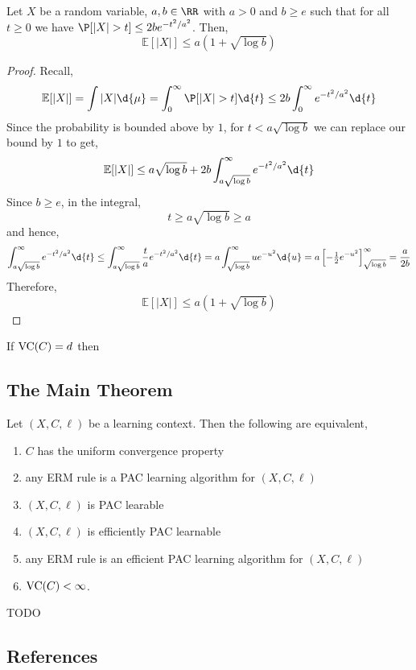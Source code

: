 \documentclass[12pt]{article}
\renewcommand{\E}{\mathbb{E}}
\begin{document}
\label{lemma_A}

\begin{lemma}
Let $X$ be a random variable, $a, b \in \RR$ with $a > 0$ and $b \ge e$ such that for all $t \ge 0$ we have $\P[|X| > t] \le 2 b e^{-t^2 / a^2}$. Then,
\[ \E[|X|] \le a (1 + \sqrt{\log{b}}) \] 
\end{lemma}

\begin{proof}
Recall,
\[ \E[|X|] = \int |X| \d{\mu} = \int_0^\infty \P[|X| > t] \d{t} \le 2 b \int_0^\infty e^{-t^2/a^2} \d{t} \]
Since the probability is bounded above by $1$, for $t < a \sqrt{\log{b}}$ we can replace our bound by $1$ to get,
\[ \E[|X|] \le a \sqrt{\log{b}} + 2 b \int_{a \sqrt{\log{b}}}^\infty e^{-t^2/a^2} \d{t} \]
Since $b \ge e$, in the integral,
\[ t \ge a \sqrt{\log{b}} \ge a \]
and hence,
\[ \int_{a \sqrt{\log{b}}}^\infty e^{-t^2/a^2} \d{t} \le \int_{a \sqrt{\log{b}}}^\infty \frac{t}{a} e^{-t^2/a^2} \d{t} = a \int_{\sqrt{\log{b}}}^\infty u e^{-u^2} \d{u} = a \left[- \tfrac{1}{2} e^{-u^2} \right]_{\sqrt{\log{b}}}^\infty = \frac{a}{2b} \]
Therefore,
\[ \E[|X|] \le a(1 + \sqrt{\log{b}}) \]
\end{proof}

\begin{cor}
If $\mathrm{VC}(C) = d$ then 
\end{cor}

\subsection{The Main Theorem}

\begin{theorem}
Let $(X, C, \ell)$ be a learning context. Then the following are equivalent,
\begin{enumerate}
\item $C$ has the uniform convergence property
\item any ERM rule is a PAC learning algorithm for $(X, C, \ell)$
\item $(X, C, \ell)$ is PAC learable
\item $(X, C, \ell)$ is efficiently PAC learnable
\item any ERM rule is an efficient PAC learning algorithm for $(X, C, \ell)$
\item $\mathrm{VC}(C) < \infty$.
\end{enumerate}
\end{theorem}

{\color{red} TODO}

\subsection{References}
\end{document}
